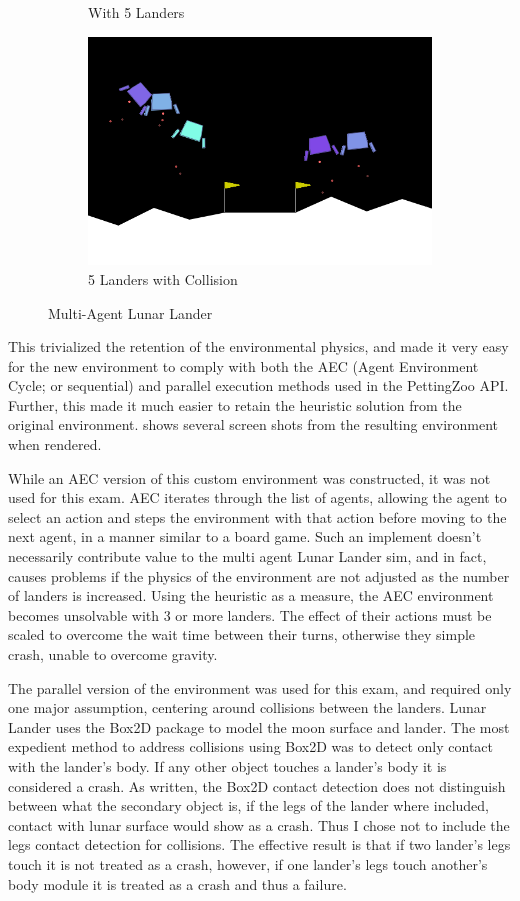 \documentclass[12pt,letterpaper]{exam}
\begin{document}
\begin{figure}[h]
\begin{subfigure}{.48\textwidth}
		\caption{With 5 Landers}
	\end{subfigure}
	\begin{subfigure}{.48\textwidth}
		\centering
		\includegraphics[width=.75\linewidth]{penta_lander_2.png}
		\caption{5 Landers with Collision}
	\end{subfigure}
	\caption{Multi-Agent Lunar Lander}
	\label{fig:landers}
\end{figure}

This trivialized the retention of the environmental physics,
and made it very easy for the new environment to comply with both the 
AEC (Agent Environment Cycle; or sequential) and parallel execution 
methods used in the PettingZoo API. Further, this made it much easier 
to retain the heuristic solution from the original environment.
 shows several screen shots from the resulting environment
when rendered. 

While an AEC version of this custom environment was constructed,
it was not used for this exam. AEC iterates through the list of agents, 
allowing the agent to select an action and steps the environment with that 
action before moving to the next agent, in a manner similar to a board game.
Such an implement doesn't necessarily contribute value to the 
multi agent Lunar Lander sim, and in fact, causes problems if the physics
of the environment are not adjusted as the number of landers is increased.
Using the heuristic as a measure, the AEC environment becomes unsolvable
with 3 or more landers. The effect of their actions must be scaled to overcome
the wait time between their turns, otherwise they simple crash, unable to 
overcome gravity.

The parallel version of the environment was used for this exam, and required 
only one major assumption, centering around collisions between the landers. 
Lunar Lander uses the Box2D package to model the moon surface and lander.
The most expedient method to address collisions using Box2D was to detect
only contact with the lander's body.
If any other object touches a lander's body it is considered a crash.
As written, the Box2D contact detection does not distinguish between 
what the secondary object is, if the legs of the lander where
included, contact with lunar surface would show as a crash.
Thus I chose not to include the legs contact detection for collisions.
The effective result is that if two lander's legs touch it is not treated
as a crash, however, if one lander's legs touch another's body module
it is treated as a crash and thus a failure.
\end{document}
